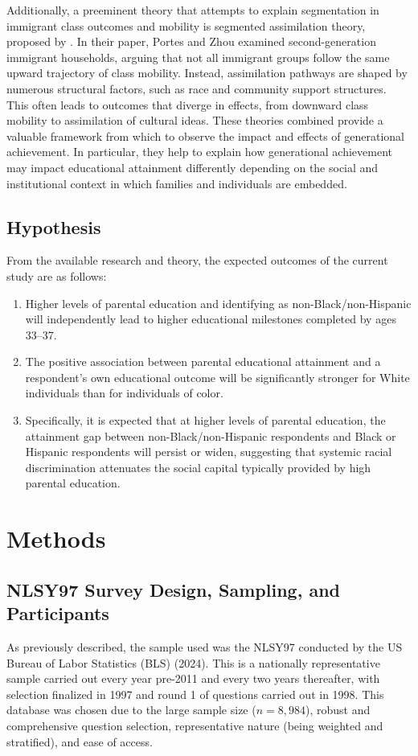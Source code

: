\documentclass[jou,12pt,floatsintext]{apa7}
\begin{document}
Additionally, a preeminent theory that attempts to explain segmentation in immigrant class outcomes and mobility is segmented assimilation theory, proposed by \textcite{portes_new_1993}. In their paper, Portes and Zhou examined second-generation immigrant households, arguing that not all immigrant groups follow the same upward trajectory of class mobility. Instead, assimilation pathways are shaped by numerous structural factors, such as race and community support structures. This often leads to outcomes that diverge in effects, from downward class mobility to assimilation of cultural ideas. These theories combined provide a valuable framework from which to observe the impact and effects of generational achievement. In particular, they help to explain how generational achievement may impact educational attainment differently depending on the social and institutional context in which families and individuals are embedded.

\subsection{Hypothesis}
From the available research and theory, the expected outcomes of the current study are as follows:

\begin{enumerate}[label=H\textsubscript{\arabic*}:]
  \item Higher levels of parental education and identifying as non-Black/non-Hispanic will independently lead to higher educational milestones completed by ages 33--37.
  \item The positive association between parental educational attainment and a respondent's own educational outcome will be significantly stronger for White individuals than for individuals of color.
  \item Specifically, it is expected that at higher levels of parental education, the attainment gap between non-Black/non-Hispanic respondents and Black or Hispanic respondents will persist or widen, suggesting that systemic racial discrimination attenuates the social capital typically provided by high parental education.
\end{enumerate}

\section{Methods}
\subsection{NLSY97 Survey Design, Sampling, and Participants}
As previously described, the sample used was the NLSY97 conducted by the US Bureau of Labor Statistics (BLS) (2024)\nocite{noauthor_nlsy97_nodate}. This is a nationally representative sample carried out every year pre-2011 and every two years thereafter, with selection finalized in 1997 and round 1 of questions carried out in 1998. This database was chosen due to the large sample size ($\textit{n} = 8,984$), robust and comprehensive question selection, representative nature (being weighted and stratified), and ease of access.
\end{document}
